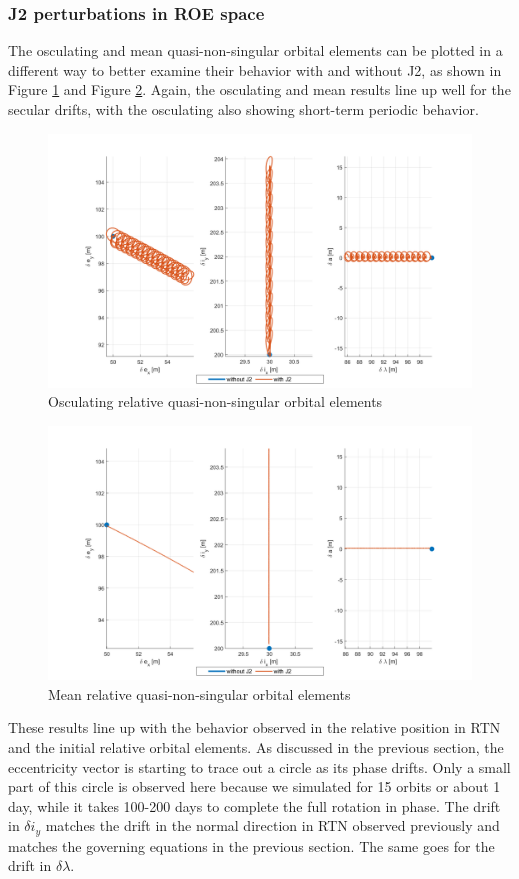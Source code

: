 \subsubsection{J2 perturbations in ROE space}
The osculating and mean quasi-non-singular orbital elements can be plotted in a different way to better examine their behavior with and without J2, as shown in Figure \ref{fig:osc_ROE_proj} and Figure \ref{fig:mean_ROE_proj}. Again, the osculating and mean results line up well for the secular drifts, with the osculating also showing short-term periodic behavior. 

\begin{figure}[H]
    \centering
    \includegraphics[width=0.75\linewidth]{sim/figures/PS4/ROE_projections_osc_SV2.png}
    \caption{Osculating relative quasi-non-singular orbital elements}
    \label{fig:osc_ROE_proj}
\end{figure}
\begin{figure}[H]
    \centering
    \includegraphics[width=0.75\linewidth]{sim/figures/PS4/ROE_projections_mean_SV2.png}
    \caption{Mean relative quasi-non-singular orbital elements}
    \label{fig:mean_ROE_proj}
\end{figure}

These results line up with the behavior observed in the relative position in RTN and the initial relative orbital elements. As discussed in the previous section, the eccentricity vector is starting to trace out a circle as its phase drifts. Only a small part of this circle is observed here because we simulated for 15 orbits or about 1 day, while it takes 100-200 days to complete the full rotation in phase. The drift in $\delta i_y$ matches the drift in the normal direction in RTN observed previously and matches the governing equations in the previous section. The same goes for the drift in $\delta \lambda$. 

